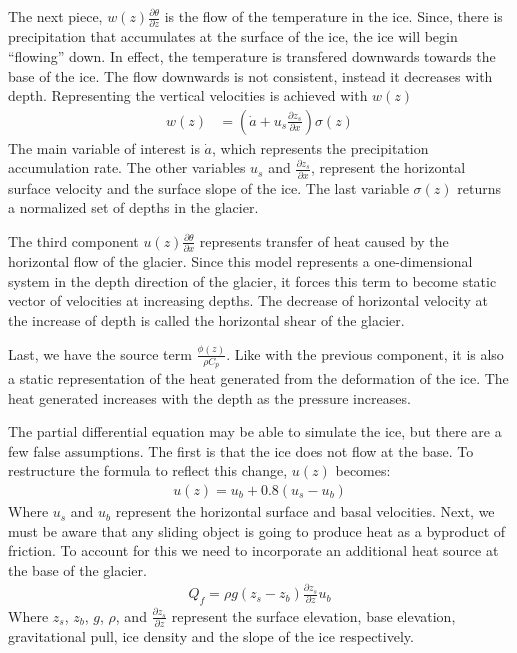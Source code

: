 \documentclass{article}%
\begin{document}
    The next piece, $w(z) \frac{\partial \theta}{\partial z}$ is the flow of the temperature in the ice. 
    Since, there is precipitation that accumulates at the surface of the ice, the ice will begin ``flowing'' down. 
    In effect, the temperature is transfered downwards towards the base of the ice. 
    The flow downwards is not consistent, instead it decreases with depth. Representing the vertical velocities is achieved with $w(z)$
    \begin{align*}
        w(z) &= (\dot{a} + u_s \frac{\partial z_s}{\partial x}) \sigma(z)
    \end{align*}
    The main variable of interest is $\dot{a}$, which represents the precipitation accumulation rate. 
    The other variables $u_s$ and $\frac{\partial z_s}{\partial x}$, represent the horizontal surface velocity and the surface slope of the ice. 
    The last variable $\sigma(z)$ returns a normalized set of depths in the glacier. 

    The third component $u(z) \frac{\partial \theta}{\partial x}$ represents transfer of heat caused by the horizontal flow of the glacier. 
    Since this model represents a one-dimensional system in the depth direction of the glacier, it forces this term to become static vector of velocities at increasing depths. 
    The decrease of horizontal velocity at the increase of depth is called the horizontal shear of the glacier. 

    Last, we have the source term $\frac{\phi(z)}{\rho C_p}$. 
    Like with the previous component, it is also a static representation of the heat generated from the deformation of the ice. 
    The heat generated increases with the depth as the pressure increases. 

    The partial differential equation may be able to simulate the ice, but there are a few false assumptions.   
    The first is that the ice does not flow at the base. 
    To restructure the formula to reflect this change, $u(z)$ becomes:
    \begin{align*}
        u(z) = u_b + 0.8(u_s - u_b)
    \end{align*}
    Where $u_s$ and $u_b$ represent the horizontal surface and basal velocities. 
    Next, we must be aware that any sliding object is going to produce heat as a byproduct of friction. 
    To account for this we need to incorporate an additional heat source at the base of the glacier.  
    \begin{align*}
        Q_f = \rho g (z_s - z_b) \frac{\partial z_s}{\partial z} u_b
    \end{align*}  
    Where $z_s$, $z_b$, $g$, $\rho$, and $\frac{\partial z_s}{\partial z}$ represent the surface elevation, base elevation, gravitational pull, ice density and the slope of the ice respectively. 
\end{document}
